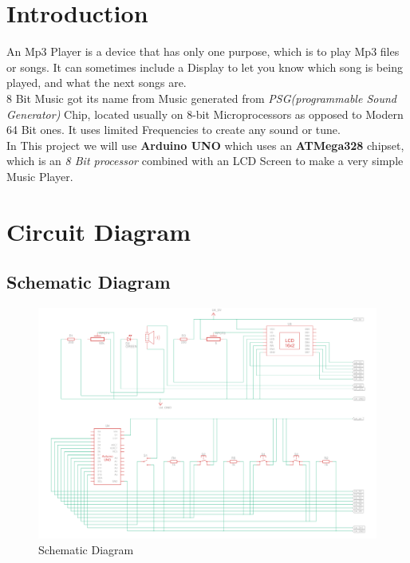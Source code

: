\documentclass[11pt]{article}
\begin{document}
	

\tableofcontents
\thispagestyle{empty}
\clearpage


\setcounter{page}{1}


\section{Introduction}
An Mp3 Player is a device that has only one purpose, which is to play Mp3 files or songs. It can sometimes include a Display to let you know which song is being played, and what the next songs are.\\

8 Bit Music got its name from Music generated from \textit{PSG(programmable Sound
Generator)} Chip, located usually on 8-bit Microprocessors as opposed to Modern 64 Bit ones. It uses limited Frequencies to create any sound or tune.\\

In This project we will use \textbf{Arduino UNO} which uses an \textbf{ATMega328} chipset, which is an \textit{8 Bit processor} combined with an LCD Screen to make a very simple Music Player.

\section{Circuit Diagram}
\subsection{Schematic Diagram}
\begin{figure}[H]
	\centering
	\includegraphics[scale=.45]{Main Circuit Diagram.png}
	\caption{Schematic Diagram}
	\label{fig:Schematic Diagram}
\end{figure}
\end{document}

